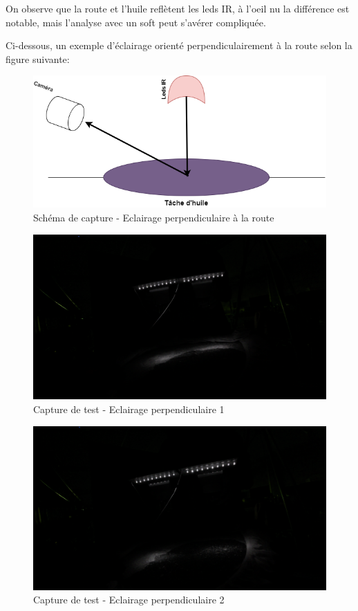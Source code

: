 On observe que la route et l'huile reflètent les leds IR, à l'oeil nu la différence est notable, mais l'analyse avec un soft peut s'avérer compliquée.

Ci-dessous, un exemple d'éclairage orienté perpendiculairement à la route selon la figure suivante:
\begin{figure}[H]
    \centering
    \includegraphics[width=13cm]{assets/figures/eclairage_perpendiculaire.png}
    \caption{Schéma de capture - Eclairage perpendiculaire à la route}
\end{figure}

\begin{figure}[H]
    \centering
    \includegraphics[width=13cm]{assets/figures/eclairage_perpendiculaire1.png}
    \caption{Capture de test - Eclairage perpendiculaire 1}
\end{figure}
\newpage
\begin{figure}[H]
    \centering
    \includegraphics[width=13cm]{assets/figures/eclairage_perpendiculaire2.png}
    \caption{Capture de test - Eclairage perpendiculaire 2}
\end{figure}


